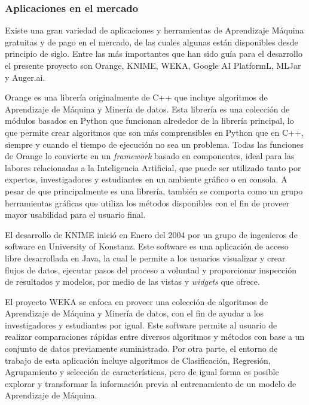 \subsubsection{Aplicaciones en el mercado}

Existe una gran variedad de aplicaciones y herramientas de Aprendizaje Máquina gratuitas y de pago en el mercado, de las cuales algunas están disponibles desde principio de siglo. Entre las más importantes que han sido guía para el desarrollo el presente proyecto son Orange, KNIME, WEKA, Google AI PlatformL, MLJar y Auger.ai.

\begin{APAitemize}
    \item Orange \parencite{Demsar2004} es una librería originalmente de C++ que incluye algoritmos de Aprendizaje de Máquina y Minería de datos. Esta librería es una colección de módulos basados en Python que funcionan alrededor de la librería principal, lo que permite crear algoritmos que son más comprensibles en Python que en C++, siempre y cuando el tiempo de ejecución no sea un problema. Todas las funciones de Orange lo convierte en un \textit{framework} basado en componentes, ideal para las labores relacionadas a la Inteligencia Artificial, que puede ser utilizado tanto por expertos, investigadores y estudiantes en un ambiente gráfico o en consola. A pesar de que principalmente es una librería, también se comporta como un grupo herramientas gráficas que utiliza los métodos disponibles con el fin de proveer mayor usabilidad para el usuario final.
    \item El desarrollo de KNIME \parencite{BCDG07} inició en Enero del 2004 por un grupo de ingenieros de software en University of Konstanz. Este software es una aplicación de acceso libre desarrollada en Java, la cual le permite a los usuarios visualizar y crear flujos de datos, ejecutar pasos del proceso a voluntad y proporcionar inspección de resultados y modelos, por medio de las vistas y \textit{widgets} que ofrece.
    \item El proyecto WEKA \parencite{Hall2009} se enfoca en proveer una colección de algoritmos de Aprendizaje de Máquina y Minería de datos, con el fin de ayudar a los investigadores y estudiantes por igual. Este software permite al usuario de realizar comparaciones rápidas entre diversos algoritmos y métodos con base a un conjunto de datos previamente suministrado. Por otra parte, el entorno de trabajo de esta aplicación incluye algoritmos de Clasificación, Regresión, Agrupamiento y selección de características, pero de igual forma es posible explorar y transformar la información previa al entrenamiento de un modelo de Aprendizaje de Máquina.

\end{APAitemize}
